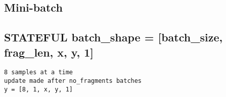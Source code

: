 \documentclass[11pt]{article}
\begin{document}
    \hypertarget{mini-batch}{%
\subsection{Mini-batch}\label{mini-batch}}

\hypertarget{stateful-batch_shape-batch_size-frag_len-x-y-1}{%
\subsection{STATEFUL batch\_shape = {[}batch\_size, frag\_len, x, y,
1{]}}\label{stateful-batch_shape-batch_size-frag_len-x-y-1}}

\begin{verbatim}
8 samples at a time
update made after no_fragments batches
y = [8, 1, x, y, 1]
\end{verbatim}
\end{document}
